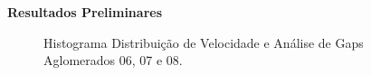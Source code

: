 \documentclass[xcolor=dvipsnames,10pt]{beamer}
\begin{document}
\begin{frame}{\textbf{Resultados Preliminares}}
\begin{figure}[!htbp]
    \caption{Histograma Distribuição de Velocidade e Análise de Gaps Aglomerados 06, 07 e 08.}
  \end{figure}
\end{frame}
\end{document}
